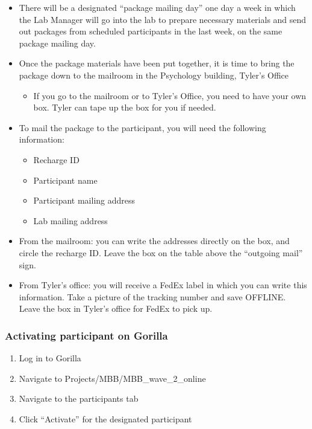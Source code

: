 \documentclass[]{book}
\providecommand{\tightlist}{%
  \setlength{\itemsep}{0pt}\setlength{\parskip}{0pt}}
\begin{document}
\begin{itemize}
\tightlist
\item
  There will be a designated ``package mailing day'' one day a week in which the Lab Manager will go into the lab to prepare necessary materials and send out packages from scheduled participants in the last week, on the same package mailing day.
\item
  Once the package materials have been put together, it is time to bring the package down to the mailroom in the Psychology building, Tyler's Office

  \begin{itemize}
  \tightlist
  \item
    If you go to the mailroom or to Tyler's Office, you need to have your own box. Tyler can tape up the box for you if needed.
  \end{itemize}
\item
  To mail the package to the participant, you will need the following information:

  \begin{itemize}
  \tightlist
  \item
    Recharge ID
  \item
    Participant name
  \item
    Participant mailing address
  \item
    Lab mailing address
  \end{itemize}
\item
  From the mailroom: you can write the addresses directly on the box, and circle the recharge ID. Leave the box on the table above the ``outgoing mail'' sign.\\
\item
  From Tyler's office: you will receive a FedEx label in which you can write this information. Take a picture of the tracking number and save OFFLINE. Leave the box in Tyler's office for FedEx to pick up.
\end{itemize}

\hypertarget{activating-participant-on-gorilla-1}{%
\subsubsection{Activating participant on Gorilla}\label{activating-participant-on-gorilla-1}}

\begin{enumerate}
\def\labelenumi{\arabic{enumi}.}
\tightlist
\item
  Log in to Gorilla
\item
  Navigate to Projects/MBB/MBB\_wave\_2\_online
\item
  Navigate to the participants tab
\item
  Click ``Activate'' for the designated participant
\end{enumerate}
\end{document}
